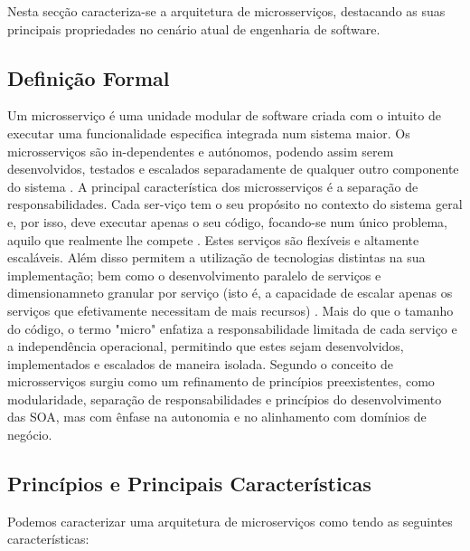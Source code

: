 Nesta secção caracteriza-se a arquitetura de microsserviços, destacando as suas principais propriedades no cenário atual de engenharia de software.

\subsection{Definição Formal}

Um microsserviço é uma unidade modular de software criada com o intuito de executar uma funcionalidade especifica integrada num sistema maior. Os microsserviços são in-dependentes e autónomos, podendo assim serem desenvolvidos, testados e escalados separadamente de qualquer outro componente do sistema \cite{Jamshidi2018}. A principal característica dos microsserviços é a separação de responsabilidades. Cada ser-viço tem o seu propósito no contexto do sistema geral e, por isso, deve executar apenas o seu código, focando-se num único problema, aquilo que realmente lhe compete \cite{Newman2015}. Estes serviços são flexíveis e altamente escaláveis. Além disso permitem a utilização de tecnologias distintas na sua implementação; bem como o desenvolvimento paralelo de serviços e dimensionamneto granular por serviço (isto é, a capacidade de escalar apenas os serviços que efetivamente necessitam de mais recursos) \cite{Lewis2014}. Mais do que o tamanho do código, o termo "micro" enfatiza a responsabilidade limitada de cada serviço e a independência operacional, permitindo que estes sejam desenvolvidos, implementados e escalados de maneira isolada. Segundo \cite{Dragoni2017} o conceito de microsserviços surgiu como um refinamento de princípios preexistentes, como modularidade, separação de responsabilidades e princípios do desenvolvimento das SOA, mas com ênfase na autonomia e no alinhamento com domínios de negócio.


\subsection{Princípios e Principais Características}

Podemos caracterizar uma arquitetura de microserviços como tendo as seguintes características:


